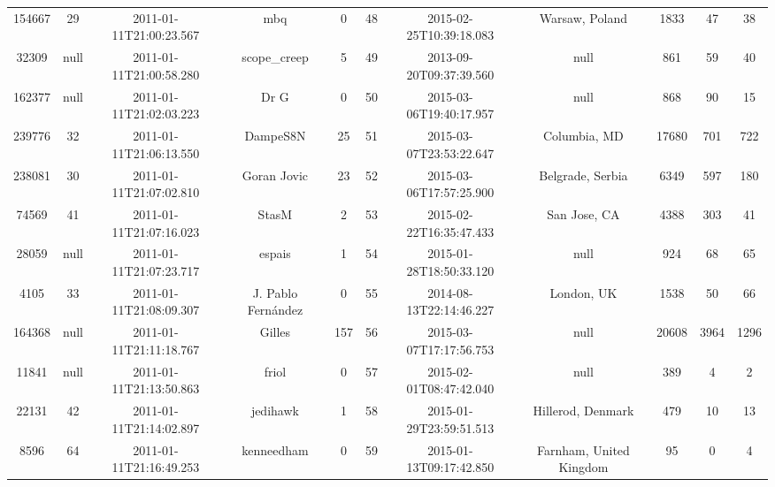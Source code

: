 \documentclass[12pt,a4paper,twoside,openright,titlepage,final]{article}
\begin{document}
\begin{enumerate}
\begin{table}[htbp!]
{\begin{tabular}{@{}ccccccccccc@{}}
			154667    & 29   & 2011-01-11T21:00:23.567 & mbq                   & 0         & 48    & 2015-02-25T10:39:18.083 & Warsaw, Poland                   & 1833       & 47      & 38    \\
			32309     & null & 2011-01-11T21:00:58.280 & scope\_creep          & 5         & 49    & 2013-09-20T09:37:39.560 & null                             & 861        & 59      & 40    \\
			162377    & null & 2011-01-11T21:02:03.223 & Dr G                  & 0         & 50    & 2015-03-06T19:40:17.957 & null                             & 868        & 90      & 15    \\
			239776    & 32   & 2011-01-11T21:06:13.550 & DampeS8N              & 25        & 51    & 2015-03-07T23:53:22.647 & Columbia, MD                     & 17680      & 701     & 722   \\
			238081    & 30   & 2011-01-11T21:07:02.810 & Goran Jovic           & 23        & 52    & 2015-03-06T17:57:25.900 & Belgrade, Serbia                 & 6349       & 597     & 180   \\
			74569     & 41   & 2011-01-11T21:07:16.023 & StasM                 & 2         & 53    & 2015-02-22T16:35:47.433 & San Jose, CA                     & 4388       & 303     & 41    \\
			28059     & null & 2011-01-11T21:07:23.717 & espais                & 1         & 54    & 2015-01-28T18:50:33.120 & null                             & 924        & 68      & 65    \\
			4105      & 33   & 2011-01-11T21:08:09.307 & J. Pablo Fernández    & 0         & 55    & 2014-08-13T22:14:46.227 & London, UK                       & 1538       & 50      & 66    \\
			164368    & null & 2011-01-11T21:11:18.767 & Gilles                & 157       & 56    & 2015-03-07T17:17:56.753 & null                             & 20608      & 3964    & 1296  \\
			11841     & null & 2011-01-11T21:13:50.863 & friol                 & 0         & 57    & 2015-02-01T08:47:42.040 & null                             & 389        & 4       & 2     \\
			22131     & 42   & 2011-01-11T21:14:02.897 & jedihawk              & 1         & 58    & 2015-01-29T23:59:51.513 & Hillerod, Denmark                & 479        & 10      & 13    \\
			8596      & 64   & 2011-01-11T21:16:49.253 & kenneedham            & 0         & 59    & 2015-01-13T09:17:42.850 & Farnham, United Kingdom          & 95         & 0       & 4     \\

\end{tabular}}
\end{table}
\end{enumerate}
\end{document}
